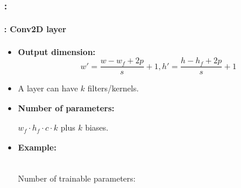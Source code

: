 \documentclass[xcolor=table]{beamer}
\begin{document}
\begin{frame}
	\frametitle{\insertshortsubtitle: \insertsection}
	\framesubtitle{\insertsubsection: Conv2D layer}

	\begin{minipage}{0.65\textwidth} 
		\begin{itemize}
			\item \textbf{Output dimension:}
			\[w' = \frac{w - w_f + 2p}{s} + 1, h' = \frac{h - h_f + 2p}{s} + 1\]
			\item A layer can have $k$ filters/kernels.
			\item \textbf{Number of parameters:} 
			
			$w_f \cdot h_f \cdot c \cdot k$ plus $k$ biases.
			
			\item \textbf{Example:} 
			
			  \\ Number of trainable parameters: 
		\end{itemize}
	\end{minipage}
	\begin{minipage}{0.34\textwidth}
		
	\end{minipage}

\end{frame}
\end{document}
